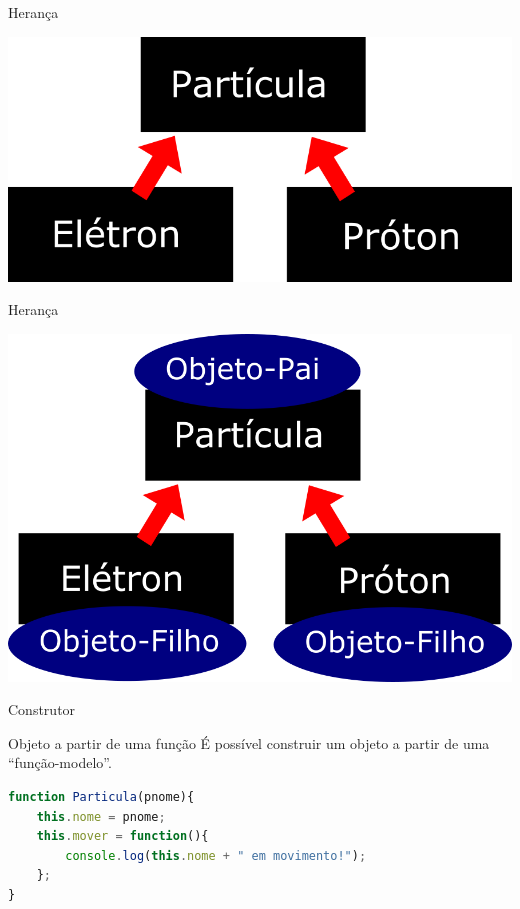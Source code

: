 \documentclass[xcolor=dvipsnames,table]{beamer}
\begin{document}
\begin{frame}{Herança}
	\begin{center}
		\includegraphics[scale=0.3]{images/heranca02.png}
	\end{center}
\end{frame}

\begin{frame}{Herança}
	\begin{center}
		\includegraphics[scale=0.3]{images/heranca03.png}
	\end{center}
\end{frame}

\begin{frame}[fragile]{Construtor}
	\begin{block}{Objeto a partir de uma função}
		É possível construir um objeto a partir de uma ``função-modelo''.
		\begin{lstlisting}[language=JavaScript]
function Particula(pnome){
	this.nome = pnome;
	this.mover = function(){
		console.log(this.nome + " em movimento!");
	};
}
\end{lstlisting}	
	\end{block}
\end{frame}
\end{document}

